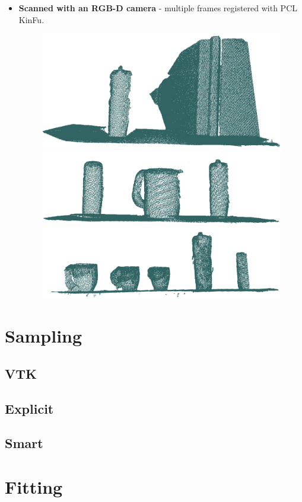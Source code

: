 \documentclass{article}
\begin{document}
\begin{itemize}
		
	\item{\textbf{Scanned with an RGB-D camera} - multiple frames registered with PCL KinFu.}
		\begin{figure}[h]
		\centering
		\includegraphics[width=0.3\columnwidth]{figures/kinfu_1}
		\includegraphics[width=0.3\columnwidth]{figures/kinfu_2}
		\includegraphics[width=0.3\columnwidth]{figures/kinfu_3}
		\end{figure}
\end{itemize}
		
		
		
	


\section {Sampling}
\label{sec:sampling}

\subsection {VTK}

\subsection {Explicit}

\subsection {Smart}


\section {Fitting}
\label{sec:fitting}
\end{document}
